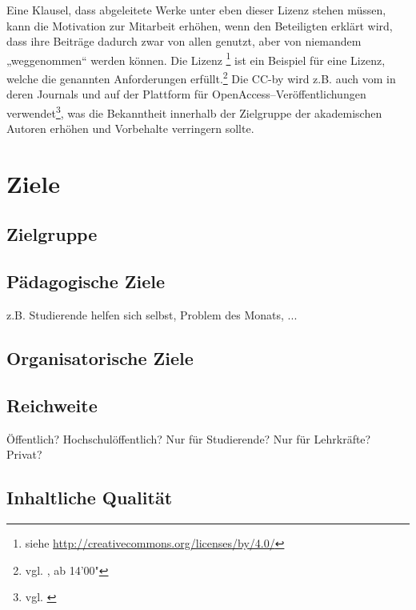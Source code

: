 Eine Klausel, dass abgeleitete Werke unter eben dieser Lizenz stehen müssen, kann die Motivation zur Mitarbeit erhöhen, wenn den Beteiligten erklärt wird, dass ihre Beiträge dadurch zwar von allen genutzt, aber von niemandem „weggenommen“ werden können. Die Lizenz \footnote{siehe \url{http://creativecommons.org/licenses/by/4.0/}} ist ein Beispiel für eine Lizenz, welche die genannten Anforderungen erfüllt.\footnote{vgl. \cite{baraniuk}, ab 14'00"} Die \ac{CC-by} wird z.B. auch vom  in deren Journals und auf der Plattform  für OpenAccess–Veröffentlichungen verwendet\footnote{vgl. \cite{springercc}}, was die Bekanntheit innerhalb der Zielgruppe der akademischen Autoren erhöhen und Vorbehalte verringern sollte.



\section{Ziele} %
\label{sec:ziele}

\subsection{Zielgruppe} %
\label{sub:zielgruppe}


\subsection{Pädagogische Ziele} %
\label{sub:padagogische_ziele}
z.B. Studierende helfen sich selbst, Problem des Monats, ...

\subsection{Organisatorische Ziele} %
\label{sub:organisatorische_ziele}


\subsection{Reichweite} %
\label{sub:reichweite}
Öffentlich? Hochschulöffentlich? Nur für Studierende? Nur für Lehrkräfte? Privat?

\subsection{Inhaltliche Qualität} %
\label{sub:inhaltliche_qualitat}


